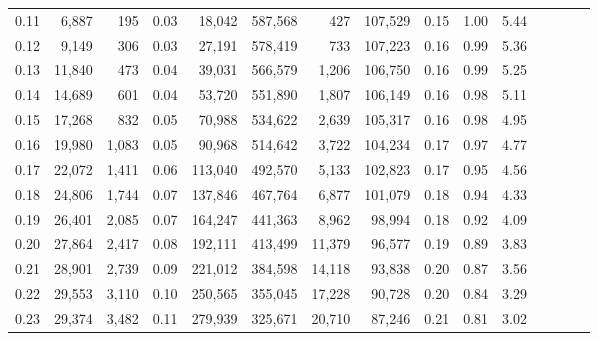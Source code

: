 \begin{tabular}{rrrcrrrrrrrrrrr}
0.11 &   6,887 &    195 &                                       0.03 &   18,042 &  587,568 &      427 &  107,529 &  0.15 &  1.00 &                         5.44 \\
0.12 &   9,149 &    306 &                                       0.03 &   27,191 &  578,419 &      733 &  107,223 &  0.16 &  0.99 &                         5.36 \\
0.13 &  11,840 &    473 &                                       0.04 &   39,031 &  566,579 &    1,206 &  106,750 &  0.16 &  0.99 &                         5.25 \\
0.14 &  14,689 &    601 &                                       0.04 &   53,720 &  551,890 &    1,807 &  106,149 &  0.16 &  0.98 &                         5.11 \\
0.15 &  17,268 &    832 &                                       0.05 &   70,988 &  534,622 &    2,639 &  105,317 &  0.16 &  0.98 &                         4.95 \\
0.16 &  19,980 &  1,083 &                                       0.05 &   90,968 &  514,642 &    3,722 &  104,234 &  0.17 &  0.97 &                         4.77 \\
0.17 &  22,072 &  1,411 &                                       0.06 &  113,040 &  492,570 &    5,133 &  102,823 &  0.17 &  0.95 &                         4.56 \\
0.18 &  24,806 &  1,744 &                                       0.07 &  137,846 &  467,764 &    6,877 &  101,079 &  0.18 &  0.94 &                         4.33 \\
0.19 &  26,401 &  2,085 &                                       0.07 &  164,247 &  441,363 &    8,962 &   98,994 &  0.18 &  0.92 &                         4.09 \\
0.20 &  27,864 &  2,417 &                                       0.08 &  192,111 &  413,499 &   11,379 &   96,577 &  0.19 &  0.89 &                         3.83 \\
0.21 &  28,901 &  2,739 &                                       0.09 &  221,012 &  384,598 &   14,118 &   93,838 &  0.20 &  0.87 &                         3.56 \\
0.22 &  29,553 &  3,110 &                                       0.10 &  250,565 &  355,045 &   17,228 &   90,728 &  0.20 &  0.84 &                         3.29 \\
0.23 &  29,374 &  3,482 &                                       0.11 &  279,939 &  325,671 &   20,710 &   87,246 &  0.21 &  0.81 &                         3.02 \\

\end{tabular}
